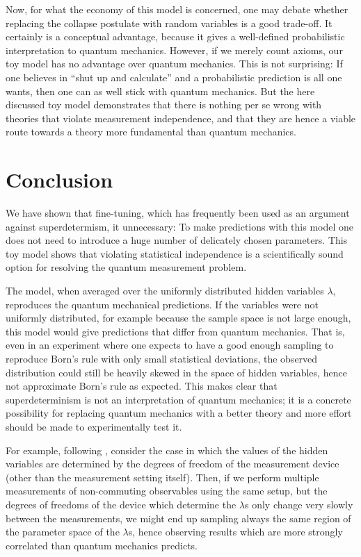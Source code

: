 \documentclass[11pt,twoside,A4]{article}
\begin{document}
Now, for what the economy of this model is concerned, one may debate whether replacing the collapse postulate with random variables is a good trade-off. It certainly is a conceptual advantage, because it gives a well-defined probabilistic interpretation to quantum mechanics. However, if we merely count axioms, our toy model has no advantage over quantum mechanics. This is not surprising: If one believes in ``shut up and calculate'' and a probabilistic prediction is all one wants, then one can as well stick with quantum mechanics. But the here discussed toy model demonstrates that there is nothing per se wrong with theories that violate measurement independence, and that they are hence a viable route towards a theory more fundamental than quantum mechanics. 


\section{Conclusion}

 We have shown that fine-tuning, which has frequently been used as an argument against superdetermism, it unnecessary: To make predictions with this model one does not need to introduce a huge number of delicately chosen parameters. This toy model shows that  violating statistical independence is a scientifically sound option for resolving the quantum measurement problem. 

The model, when averaged over the uniformly distributed hidden variables $\lambda$, reproduces the quantum mechanical predictions. If the variables were not uniformly distributed, for example because the sample space is not large enough, this model would give predictions that differ from quantum mechanics. That is, even in an experiment where one expects to have a good enough sampling to reproduce Born's rule with only small statistical deviations, the observed distribution could still be heavily skewed in the space of hidden variables, hence not approximate Born's rule as expected. This makes clear that superdeterminism is not an interpretation of quantum mechanics; it is a concrete possibility for replacing quantum mechanics with a better theory and more effort should be made to experimentally test it.

For example, following \cite{Hossenfelder:2011ct}, consider the case in which the values of the hidden variables are determined by the degrees of freedom of the measurement device (other than the measurement setting itself). Then, if we perform multiple measurements of non-commuting observables using the same setup, but the degrees of freedoms of the device which determine the $\lambda$s only change very slowly between the measurements, we might end up sampling always the same region of the parameter space of the $\lambda$s, hence observing results which are more strongly correlated than quantum mechanics predicts.
\end{document}
